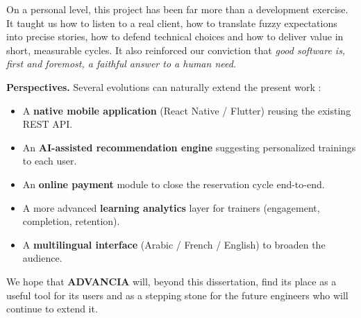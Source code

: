 \medskip
\noindent
On a personal level, this project has been far more than a development exercise. It taught us how to listen to a real client, how to translate fuzzy expectations into precise stories, how to defend technical choices and how to deliver value in short, measurable cycles. It also reinforced our conviction that \textit{good software is, first and foremost, a faithful answer to a human need}.

\medskip
\noindent
\textbf{Perspectives.} Several evolutions can naturally extend the present work :

\begin{itemize}[leftmargin=2.2em,itemsep=0.3em]
  \item A \textbf{native mobile application} (React Native / Flutter) reusing the existing REST API.
  \item An \textbf{AI-assisted recommendation engine} suggesting personalized trainings to each user.
  \item An \textbf{online payment} module to close the reservation cycle end-to-end.
  \item A more advanced \textbf{learning analytics} layer for trainers (engagement, completion, retention).
  \item A \textbf{multilingual interface} (Arabic / French / English) to broaden the audience.
\end{itemize}

\medskip
\noindent
We hope that \textbf{ADVANCIA} will, beyond this dissertation, find its place as a useful tool for its users and as a stepping stone for the future engineers who will continue to extend it.

\cleardoublepage
